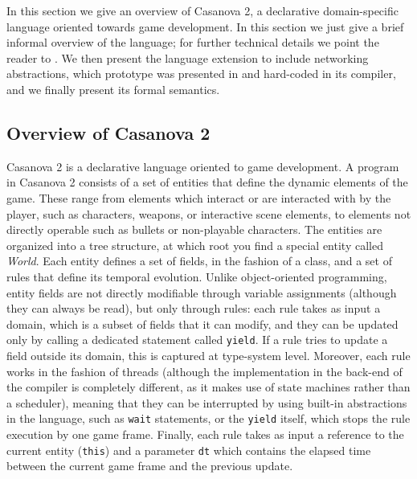 \begin{comment}
\begin{mathpar}
\tiny
\inferrule
{E \vdash t \; : \; \mathtt{float}}
{E \vdash \mathtt{wait} \; t \; : \; \mathtt{void}}

\inferrule
{E \vdash c \; : \; \mathtt{bool}}
{E \vdash \mathtt{when} \; c : \; \mathtt{void}}
\end{mathpar}
\end{comment}

In this section we give an overview of Casanova 2, a declarative domain-specific language oriented towards game development. In this section we just give a brief informal overview of the language; for further technical details we point the reader to \cite{AbbadiThesis2017,Abbadi2015}. We then present the language extension to include networking abstractions, which prototype was presented in \cite{DiGiacomo201725} and hard-coded in its compiler, and we finally present its formal semantics.

\subsection{Overview of Casanova 2}
Casanova 2 is a declarative language oriented to game development. A program in Casanova 2 consists of a set of entities that define the dynamic elements of the game. These range from elements which interact or are interacted with by the player, such as characters, weapons, or interactive scene elements, to elements not directly operable such as bullets or non-playable characters. The entities are organized into a tree structure, at which root you find a special entity called \textit{World}. Each entity defines a set of fields, in the fashion of a class, and a set of rules that define its temporal evolution. Unlike object-oriented programming, entity fields are not directly modifiable through variable assignments (although they can always be read), but only through rules: each rule takes as input a domain, which is a subset of fields that it can modify, and they can be updated only by calling a dedicated statement called \texttt{yield}. If a rule tries to update a field outside its domain, this is captured at type-system level. Moreover, each rule works in the fashion of threads (although the implementation in the back-end of the compiler is completely different, as it makes use of state machines rather than a scheduler), meaning that they can be interrupted by using built-in abstractions in the language, such as \texttt{wait} statements, or the \texttt{yield} itself, which stops the rule execution by one game frame. Finally, each rule takes as input a reference to the current entity (\texttt{this}) and a parameter \texttt{dt} which contains the elapsed time between the current game frame and the previous update.

